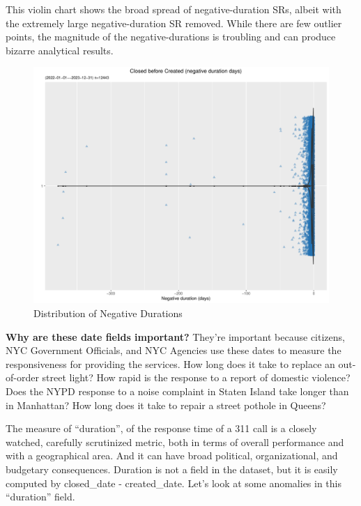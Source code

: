 \documentclass[12pt, titlepage]{article}
\begin{document}
	This violin chart shows the broad spread of negative-duration SRs, albeit with 
	the extremely large negative-duration SR removed. While there are few 
	outlier points, the magnitude of the negative-durations is troubling and can 
	produce bizarre analytical results.
	
	\begin{figure}[tbp]
	 	 \centering
	 	 \includegraphics[width = \textwidth]{negative_duration_SR_violin.pdf}
		 \caption{Distribution of Negative Durations}
		 \label{fig:negative-duration-violin}
	\end{figure}

\textbf{Why are these date fields important?} They're important because citizens, NYC Government Officials, and NYC Agencies use these dates to measure the responsiveness 
for providing the services. How long does it take to replace an out-of-order 
street light? How rapid is the response to a report of domestic violence? 
Does the NYPD response to a noise complaint in Staten Island take longer 
than in Manhattan? How long does it take to repair a street pothole in Queens? 

The measure of ``duration'', of the response time of a 311 call is a closely 
watched, carefully scrutinized metric, both in terms of overall performance 
and with a geographical area. And it can have broad political, organizational, 
and budgetary consequences. Duration is not a field in the dataset, 
but it is easily computed by closed\_date - created\_date. Let's look at 
some anomalies in this ``duration'' field.
\end{document}
